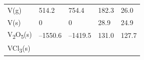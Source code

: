 \documentclass[
]{book}
\theoremstyle{definition}
\theoremstyle{definition}
\theoremstyle{definition}
\theoremstyle{remark}
\begin{document}
\begin{longtable}[]{@{}lllll@{}}
\begin{minipage}[t]{0.10\columnwidth}
V(g)\strut
\end{minipage} & \begin{minipage}[t]{0.19\columnwidth}\raggedright
514.2\strut
\end{minipage} & \begin{minipage}[t]{0.20\columnwidth}\raggedright
754.4\strut
\end{minipage} & \begin{minipage}[t]{0.18\columnwidth}\raggedright
182.3\strut
\end{minipage} & \begin{minipage}[t]{0.18\columnwidth}\raggedright
26.0\strut
\end{minipage}\tabularnewline
\begin{minipage}[t]{0.10\columnwidth}\raggedright
V(s)\strut
\end{minipage} & \begin{minipage}[t]{0.19\columnwidth}\raggedright
0\strut
\end{minipage} & \begin{minipage}[t]{0.20\columnwidth}\raggedright
0\strut
\end{minipage} & \begin{minipage}[t]{0.18\columnwidth}\raggedright
28.9\strut
\end{minipage} & \begin{minipage}[t]{0.18\columnwidth}\raggedright
24.9\strut
\end{minipage}\tabularnewline
\begin{minipage}[t]{0.10\columnwidth}\raggedright
V\textsubscript{2}O\textsubscript{5}(s)\strut
\end{minipage} & \begin{minipage}[t]{0.19\columnwidth}\raggedright
--1550.6\strut
\end{minipage} & \begin{minipage}[t]{0.20\columnwidth}\raggedright
--1419.5\strut
\end{minipage} & \begin{minipage}[t]{0.18\columnwidth}\raggedright
131.0\strut
\end{minipage} & \begin{minipage}[t]{0.18\columnwidth}\raggedright
127.7\strut
\end{minipage}\tabularnewline
\begin{minipage}[t]{0.10\columnwidth}\raggedright
VCl\textsubscript{3}(s)\strut
\end{minipage} & \begin{minipage}[t]{0.19\columnwidth}\raggedright

\end{minipage}
\end{longtable}
\end{document}
